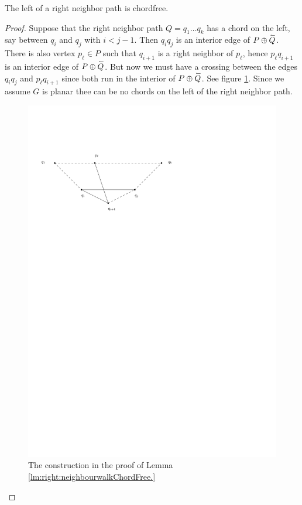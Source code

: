     \begin{lemma}
      \label{lm:right:neighbourwalkChordFree}
      The left of a right neighbor path is chordfree.
    \end{lemma}
    \begin{proof}
      Suppose that the right neighbor path $Q = q_1 \ldots q_k$  has a chord on the left, say between $q_i$ and $q_j$ with $i< j -1 $. Then $q_i q_j$ is an interior edge of $P \oplus \accentset{\leftharpoonup}{Q}$.  There is also vertex $p_\ell \in P$ such that $q_{i+1}$ is a right neighbor of $p_\ell$, hence $p_\ell q_{i+1}$ is an interior edge of $P \oplus \accentset{\leftharpoonup}{Q}$.  But now we must have a crossing between the edges $q_i q_j$ and $p_\ell q_{i+1}$ since both run in the interior of $P \oplus \accentset{\leftharpoonup}{Q}$.
      See figure \ref{fig:uni:neihbourwalkChordFree}.
      Since we assume $G$ is planar thee can be no chords on the left of the right neighbor path.

      \begin{figure}[h]
        \centering
        \includegraphics[scale=1]{unifiedAlgo/img/rightNeighbourwalk/neighbourWalkChords}
        \caption{The construction in the proof of Lemma \ref{lm:right:neighbourwalkChordFree.}}
        \label{fig:uni:neihbourwalkChordFree}
      \end{figure}
    \end{proof}
